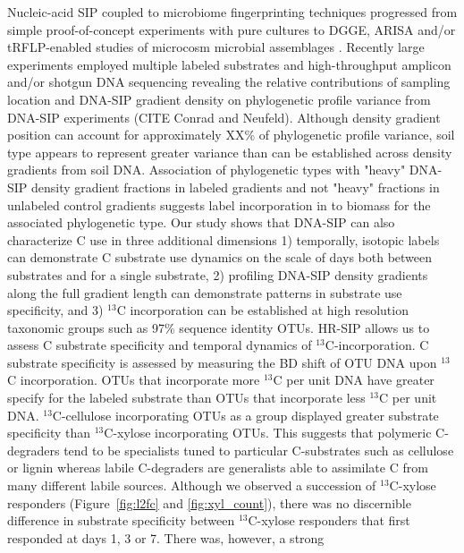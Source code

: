 Nucleic-acid SIP coupled to microbiome fingerprinting techniques progressed
from simple proof-of-concept experiments with pure cultures
\citep{radajewski2000stable} to DGGE, ARISA and/or tRFLP-enabled studies of
microcosm microbial assemblages \citep{Haichar_2007}. Recently large
experiments employed multiple labeled substrates and high-throughput amplicon
and/or shotgun DNA sequencing \citep{Verastegui_2014} revealing the relative
contributions of sampling location and DNA-SIP gradient density on phylogenetic
profile variance from DNA-SIP experiments (CITE Conrad and Neufeld). Although
density gradient position can account for approximately XX\% of phylogenetic
profile variance, soil type appears to represent greater variance than can be
established across density gradients from soil DNA. Association of phylogenetic
types with "heavy" DNA-SIP density gradient fractions in labeled gradients and
not "heavy" fractions in unlabeled control gradients suggests label
incorporation in to biomass for the associated phylogenetic type. Our study
shows that DNA-SIP can also characterize C use in three additional 
dimensions 1) temporally, isotopic labels can demonstrate C substrate use
dynamics on the scale of days both between substrates and for a single
substrate, 2) profiling DNA-SIP density gradients along the full gradient
length can demonstrate patterns in substrate use specificity, and 3) $^{13}$C
incorporation can be established at high resolution taxonomic groups such
as 97\% sequence identity OTUs.
HR-SIP allows us to assess C substrate specificity and temporal dynamics of
$^{13}$C-incorporation. C substrate specificity is assessed by measuring the BD
shift of OTU DNA upon $^{13}$C incorporation. OTUs that incorporate more
$^{13}$C per unit DNA have greater specify for the labeled substrate than OTUs
that incorporate less $^{13}$C per unit DNA. $^{13}$C-cellulose incorporating
OTUs as a group displayed greater substrate specificity than $^{13}$C-xylose
incorporating OTUs. This suggests that polymeric C-degraders tend to be
specialists tuned to particular C-substrates such as cellulose or lignin
whereas labile C-degraders are generalists able to assimilate C from many
different labile sources. Although we observed a succession of $^{13}$C-xylose
responders (Figure~\ref{fig:l2fc} and \ref{fig:xyl_count}), there was no
discernible difference in substrate specificity between $^{13}$C-xylose
responders that first responded at days 1, 3 or 7. There was, however, a strong
